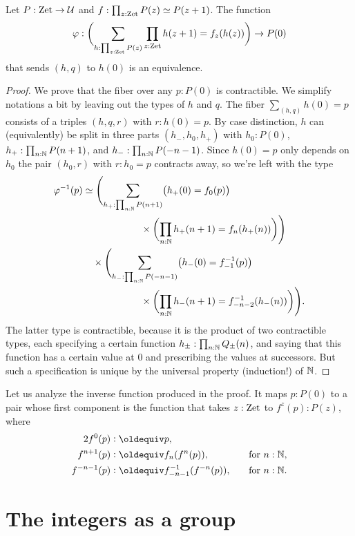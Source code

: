 \documentclass[a4,12pt]{amsart}
\begin{document}
\begin{theorem}\label{thm:integers-univ-symm}
  Let $P : \mathrm{Zet} \to \mathcal{U}$ and $f : \prod_{z:\mathrm{Zet}}P(z) \simeq P(z+1)$. The function
  \[
    \varphi : \biggl(\sum_{h:\prod_{z:\mathrm{Zet}}P(z)}\prod_{z:\mathrm{Zet}}h(z+1) = f_z(h(z))\biggr) \to P(0)
  \]
  that sends $(h,q)$ to $h(0)$ is an equivalence.
\end{theorem}
\begin{proof}
  We prove that the fiber over any $p : P(0)$ is contractible.
  We simplify notations a bit by leaving out the types of $h$ and $q$.
  The fiber $\sum_{(h,q)} h(0)=p$ consists of a triples $(h,q,r)$ with $r : h(0) = p$.
  By case distinction, $h$ can (equivalently) be split in three parts $(h_-,h_0,h_+)$
  with $h_0 : P(0)$, $h_+ : \prod_{n:\mathbb{N}}P(n+1)$,  and $h_- : \prod_{n:\mathbb{N}} P(-n-1)$. 
  Since $h(0)=p$ only depends on $h_0$ the pair $(h_0,r)$ with  $r : h_0 = p$
  contracts away, so we're left with the type
  \begin{align*}
    \varphi^{-1}(p)
    &\simeq
      \Biggl(\sum_{h_+ : \prod_{n:\mathbb{N}}P(n+1)}
      \bigl(h_+(0) = f_0(p)\bigr) \\
    &\qquad\qquad\qquad
      \times \biggl(\prod_{n:\mathbb{N}}h_+(n+1) = f_n(h_+(n))\biggr)\Biggr) \\
    &\quad\times
      \Biggl(\sum_{h_- : \prod_{n:\mathbb{N}}P(-n-1)}
      \bigl(h_-(0) = f_{-1}^{-1}(p)\bigr) \\
    &\qquad\qquad\qquad
      \times \biggl(\prod_{n:\mathbb{N}}h_-(n+1) = f_{-n-2}^{-1}(h_-(n))\biggr)\Biggr).
  \end{align*}
  The latter type is contractible, because it is the product of two contractible types,
  each specifying a certain function $h_{\pm}:\prod_{n:\mathbb{N}}Q_{\pm}(n)$,
  and saying that this function has a certain value at $0$
  and prescribing the values at successors.
  But such a specification is unique by the universal property (induction!) of $\mathbb{N}$.
\end{proof}
Let us analyze the inverse function produced in the proof.
It maps $p : P(0)$ to a pair whose first component
is the function that takes $z:\mathrm{Zet}$ to $f^z(p):P(z)$, where
\begin{alignat*}2
  f^0(p) &\defeq p, && \\
  f^{n+1}(p) &\defeq f_n(f^n(p)),&\quad&\text{for $n:\NN$,} \\
  f^{-n-1}(p) &\defeq f_{-n-1}^{-1}(f^{-n}(p)),&\quad&\text{for $n:\NN$.}
\end{alignat*}

\section{The integers as a group}
\label{sec:integers-group}
\end{document}
